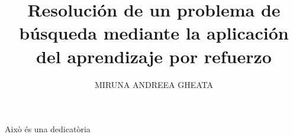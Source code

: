 \documentclass[spanish,GINF]{TFGEPSUIB}
\title{Resolución de un problema de búsqueda mediante la aplicación del aprendizaje por refuerzo}
\author{\MakeUppercase{Miruna Andreea Gheata}}
\begin{document}
\portada

\frontmatter


\maketitle

\cleartorecto \thispagestyle{empty}
\begin{agraiments}
Això és una dedicatòria %
\end{agraiments}

\cleartorecto \tableofcontents

\cleartorecto \listoffigures
\cleartorecto \listoftables 

% 

 

\mainmatter\pagestyle{ruled}














\appendix 


\backmatter



 
\end{document}

